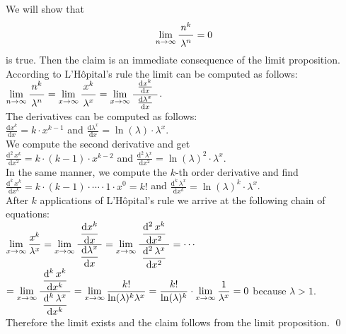 \proof  We will show that 
\hspace*{1.3cm} 
\begin{equation}
  \label{eq:star}
  \lim\limits_{n \rightarrow \infty} \bruch{n^{k}}{\lambda^n} = 0  
\end{equation}
is true.  Then the claim is an immediate consequence of the limit proposition. 
According to L'H\^opital's rule the limit can be computed as follows: \\[0.2cm]
\hspace*{1.3cm} 
$\displaystyle \lim\limits_{n \rightarrow \infty} \bruch{n^{k}}{\lambda^n} =
\lim\limits_{x \rightarrow \infty} \bruch{x^{k}}{\lambda^x} =
\lim\limits_{x \rightarrow \infty} \bruch{\;\frac{\mathrm{d}x^{k}}{\mathrm{d}x}\;}{\frac{\mathrm{d}\lambda^x}{\mathrm{d}x}}$.
\\[0.2cm]
The derivatives can be computed as follows: \\[0.2cm]
\hspace*{1.3cm}
 $\displaystyle \frac{\mathrm{d}x^{k}}{\mathrm{d}x} = k \cdot x^{k-1}$ \quad and \quad 
 $\displaystyle \frac{\mathrm{d}\lambda^{x}}{\mathrm{d}x} = \ln(\lambda) \cdot \lambda^x$. \\[0.2cm]
We compute the second derivative and get \\[0.2cm]
\hspace*{1.3cm}  
$\displaystyle \frac{\mathrm{d}^{2}\,x^{k}}{\mathrm{d}x^2} = k \cdot (k-1) \cdot x^{k-2}$ \quad and \quad 
 $\displaystyle \frac{\mathrm{d}^2\,\lambda^{x}}{\mathrm{d}x^2} = \ln(\lambda)^2 \cdot \lambda^x$. \\[0.2cm]
In the same manner, we compute the $k$-th order derivative and find \\[0.2cm]
\hspace*{1.3cm} 
$\displaystyle \frac{\mathrm{d}^{k}\,x^{k}}{\mathrm{d}x^k} = k \cdot (k-1) \cdot \cdots \cdot 1 \cdot x^{0} = k!$ \quad and \quad 
 $\displaystyle \frac{\mathrm{d}^k\,\lambda^{x}}{\mathrm{d}x^k} = \ln(\lambda)^k \cdot \lambda^x$. \\[0.2cm]
After $k$ applications of L'H\^opital's rule we arrive at the following chain of equations:
\\[0.2cm]
\hspace*{1.3cm} 
$\displaystyle 
\lim\limits_{x \rightarrow \infty} \frac{x^{k}}{\lambda^x} =
\lim\limits_{x \rightarrow \infty} \frac{\displaystyle\;\frac{\mathrm{d}x^{k}}{\mathrm{d}x}\;}{\displaystyle\frac{\mathrm{d}\lambda^x}{\mathrm{d}x}} =
\lim\limits_{x \rightarrow \infty} \frac{\displaystyle\;\frac{\mathrm{d}^2\,x^{k}}{\mathrm{d}x^2}\;}{\displaystyle\frac{\mathrm{d}^2\,\lambda^x}{\mathrm{d}x^2}} =
\cdots$
\\[0.3cm]
\hspace*{2.8cm}
$\displaystyle = 
\lim\limits_{x \rightarrow \infty} \frac{\displaystyle\;\frac{\mathrm{d}^k\,x^{k}}{\mathrm{d}x^k}\;}{\displaystyle\frac{\mathrm{d}^k\,\lambda^x}{\mathrm{d}x^k}} =
\lim\limits_{x \rightarrow \infty} \frac{k!}{\ln(\lambda)^k \lambda^x} =
\frac{k!}{\ln(\lambda)^k} \cdot \lim\limits_{x \rightarrow \infty} \frac{1}{\lambda^x} = 0$ \quad because
$\lambda > 1$.
\\[0.2cm] 
Therefore the limit exists and the claim follows from the limit proposition.
\qed

